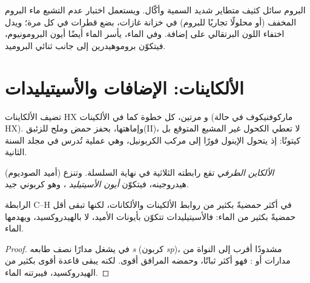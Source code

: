 \begin{inthelab}
البروم سائل كثيف متطاير شديد السمية وأكّال. ويستعمل اختبار
عدم التشبع ماء البروم المخفف (أو محلولًا تجاريًا 
للبروم) في خزانة غازات، بضع قطرات في كل مرة؛ ويدل
اختفاء اللون البرتقالي على إضافة. وفي الماء، يأسر الماء أيضًا
أيون البرومونيوم، فيتكوّن بروموهيدرين إلى جانب
ثنائي البروميد.
\end{inthelab}

\section{الألكاينات: الإضافات والأسيتيليدات}

تضيف الألكاينات HX و مرتين، كل خطوة كما في الألكينات (ماركوفنيكوف
في حالة HX). وإماهتها، بحفز حمض وملح للزئبق(II)، لا تعطي
الكحول غير المشبع المتوقع بل كيتونًا: إذ يتحول الإينول فورًا
إلى مركب الكربونيل، وهي عملية تُدرس في مجلد السنة الثانية.

\begin{definition}\label{def:b1:electrophilic-additions:acetylide}
\emph{الألكاين الطرفي}  تقع رابطته
الثلاثية في نهاية السلسلة. وتنزع  (أميد الصوديوم)
هيدروجينه، فيتكوّن \emph{أيون الأسيتيليد}
، وهو  كربوني جيد.
\end{definition}

\begin{proposition}\label{prop:b1:electrophilic-additions:acetylide-acidity}
الرابطة C--H في  أكثر حمضيةً بكثير من روابط
الألكينات والألكانات، لكنها تبقى أقل حمضيةً بكثير من الماء: فالأسيتيليدات
تتكوّن بأيونات الأميد، لا بالهيدروكسيد، ويهدمها الماء.
\end{proposition}

\begin{proof}
في  يشغل  مدارًا نصف طابعه
\textit{s} (كربون \textit{sp})، مشدودًا أقرب إلى النواة من
مدارات   أو : فهو أكثر
ثباتًا، وحمضه المرافق أقوى. لكنه يبقى قاعدة أقوى بكثير
من الهيدروكسيد، فيبرتنه الماء.
\end{proof}

